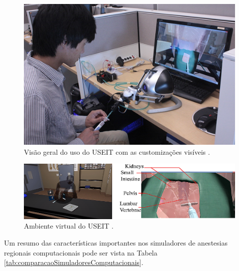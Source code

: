 \begin{figure}[ht!]
    \centering
    \includegraphics[width=0.7\linewidth]{capitulos/figuras/USEIT-uso.png} 
    \caption{Visão geral do uso do USEIT com as customizações visíveis \cite{Moo-Young2021}.}
    \label{fig:useitSim}
\end{figure}

\begin{figure}[ht!]
    \centering
    \includegraphics[width=0.7\linewidth]{capitulos/figuras/USEIT-visao-geral.png} 
    \caption{Ambiente virtual do USEIT \cite{Moo-Young2021}.}
    \label{fig:useitSimAmbienteVirtual}
\end{figure}

Um resumo das características importantes nos simuladores de anestesias regionais computacionais pode ser vista na Tabela \ref{tab:comparacaoSimuladoresComputacionais}.

